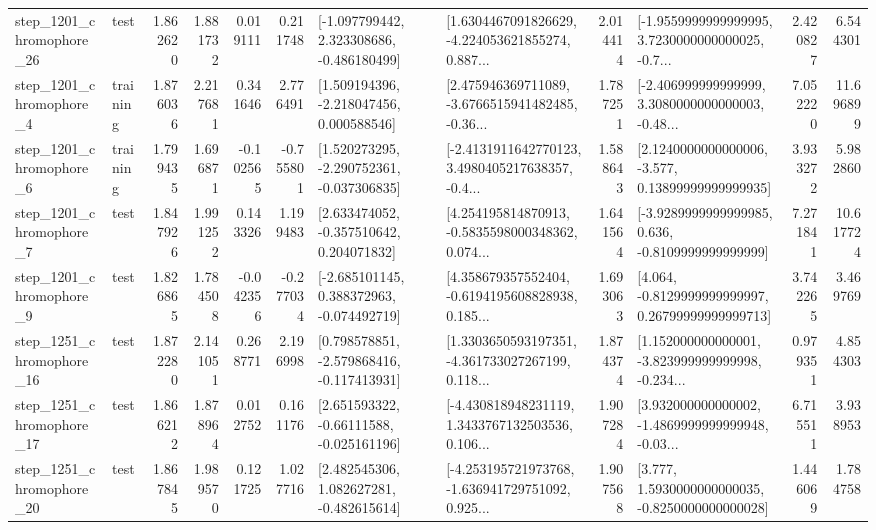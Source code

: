 \begin{tabular}{llrrrrllrlrr}
 step\_1201\_chromophore\_26 &      test &      1.862620 &    1.881732 &      0.019111 &  0.211748 &   [-1.097799442, 2.323308686, -0.486180499] &  [1.6304467091826629, -4.224053621855274, 0.887... &       2.014414 &  [-1.9559999999999995, 3.7230000000000025, -0.7... &            2.420827 &          6.544301 \\
  step\_1201\_chromophore\_4 &  training &      1.876036 &    2.217681 &      0.341646 &  2.776491 &    [1.509194396, -2.218047456, 0.000588546] &  [2.475946369711089, -3.6766515941482485, -0.36... &       1.787251 &  [-2.406999999999999, 3.3080000000000003, -0.48... &            7.052220 &         11.696899 \\
  step\_1201\_chromophore\_6 &  training &      1.799435 &    1.696871 &     -0.102565 & -0.755801 &   [1.520273295, -2.290752361, -0.037306835] &  [-2.4131911642770123, 3.4980405217638357, -0.4... &       1.588643 &  [2.1240000000000006, -3.577, 0.13899999999999935] &            3.933272 &          5.982860 \\
  step\_1201\_chromophore\_7 &      test &      1.847926 &    1.991252 &      0.143326 &  1.199483 &    [2.633474052, -0.357510642, 0.204071832] &  [4.254195814870913, -0.5835598000348362, 0.074... &       1.641564 &  [-3.9289999999999985, 0.636, -0.8109999999999999] &            7.271841 &         10.617724 \\
  step\_1201\_chromophore\_9 &      test &      1.826865 &    1.784508 &     -0.042356 & -0.277034 &   [-2.685101145, 0.388372963, -0.074492719] &  [4.358679357552404, -0.6194195608828938, 0.185... &       1.693063 &  [4.064, -0.8129999999999997, 0.26799999999999713] &            3.742265 &          3.469769 \\
 step\_1251\_chromophore\_16 &      test &      1.872280 &    2.141051 &      0.268771 &  2.196998 &   [0.798578851, -2.579868416, -0.117413931] &  [1.3303650593197351, -4.361733027267199, 0.118... &       1.874374 &  [1.152000000000001, -3.823999999999998, -0.234... &            0.979351 &          4.854303 \\
 step\_1251\_chromophore\_17 &      test &      1.866212 &    1.878964 &      0.012752 &  0.161176 &    [2.651593322, -0.66111588, -0.025161196] &  [-4.430818948231119, 1.3433767132503536, 0.106... &       1.907284 &  [3.932000000000002, -1.4869999999999948, -0.03... &            6.715511 &          3.938953 \\
 step\_1251\_chromophore\_20 &      test &      1.867845 &    1.989570 &      0.121725 &  1.027716 &    [2.482545306, 1.082627281, -0.482615614] &  [-4.253195721973768, -1.636941729751092, 0.925... &       1.907568 &   [3.777, 1.5930000000000035, -0.8250000000000028] &            1.446069 &          1.784758 \\

\end{tabular}
